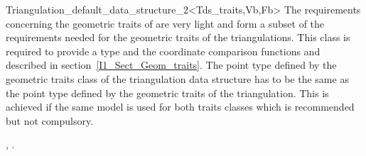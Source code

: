 \begin{ccRefClass}{Triangulation_default_data_structure_2<Tds_traits,Vb,Fb>}
The requirements concerning the geometric traits  of
 are very light and form a subset of the requirements needed
for the geometric traits of the triangulations. 
This class is required  to provide a type 
and the coordinate comparison functions  and
described in section~\ref{I1_Sect_Geom_traits}. The point type
defined by the geometric traits class of the triangulation data structure
has to be the same 
as the point type defined by the geometric traits of the triangulation.
This is achieved if the same model is used for both traits classes
which is recommended but not compulsory.



\ccIsModel



\ccSeeAlso

,
.


\end{ccRefClass}


